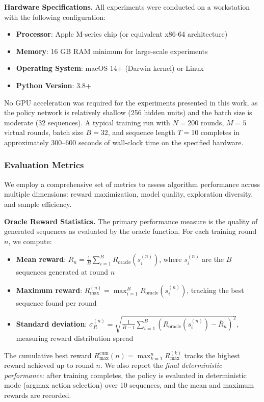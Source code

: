 \textbf{Hardware Specifications.} All experiments were conducted on a workstation with the following configuration:
\begin{itemize}
    \item \textbf{Processor}: Apple M-series chip (or equivalent x86-64 architecture)
    \item \textbf{Memory}: 16 GB RAM minimum for large-scale experiments
    \item \textbf{Operating System}: macOS 14+ (Darwin kernel) or Linux
    \item \textbf{Python Version}: 3.8+
\end{itemize}

No GPU acceleration was required for the experiments presented in this work, as the policy network is relatively shallow (256 hidden units) and the batch size is moderate (32 sequences). A typical training run with $N = 200$ rounds, $M = 5$ virtual rounds, batch size $B = 32$, and sequence length $T = 10$ completes in approximately 300--600 seconds of wall-clock time on the specified hardware.

\subsubsection{Evaluation Metrics}

We employ a comprehensive set of metrics to assess algorithm performance across multiple dimensions: reward maximization, model quality, exploration diversity, and sample efficiency.

\textbf{Oracle Reward Statistics.} The primary performance measure is the quality of generated sequences as evaluated by the oracle function. For each training round $n$, we compute:
\begin{itemize}
    \item \textbf{Mean reward}: $\bar{R}_n = \frac{1}{B}\sum_{i=1}^{B} R_{\text{oracle}}(s_i^{(n)})$, where $s_i^{(n)}$ are the $B$ sequences generated at round $n$
    \item \textbf{Maximum reward}: $R_{\max}^{(n)} = \max_{i=1}^{B} R_{\text{oracle}}(s_i^{(n)})$, tracking the best sequence found per round
    \item \textbf{Standard deviation}: $\sigma_R^{(n)} = \sqrt{\frac{1}{B-1}\sum_{i=1}^{B}(R_{\text{oracle}}(s_i^{(n)}) - \bar{R}_n)^2}$, measuring reward distribution spread
\end{itemize}

The cumulative best reward $R_{\max}^{\text{cum}}(n) = \max_{k=1}^{n} R_{\max}^{(k)}$ tracks the highest reward achieved up to round $n$. We also report the \textit{final deterministic performance}: after training completes, the policy is evaluated in deterministic mode (argmax action selection) over 10 sequences, and the mean and maximum rewards are recorded.

